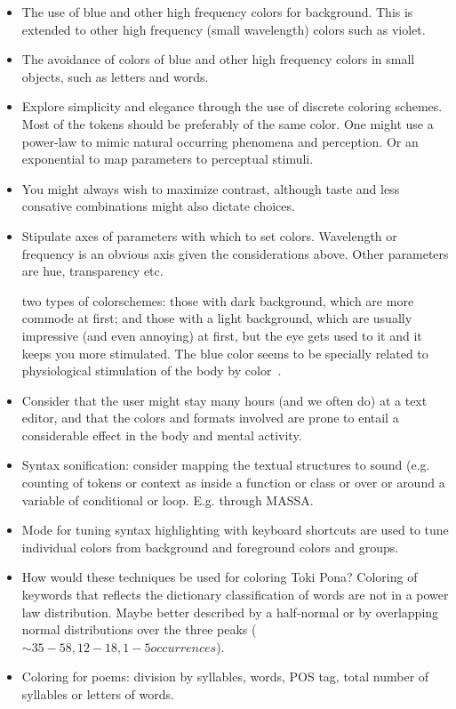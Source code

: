 \documentclass{article}
\begin{document}
\begin{itemize}
  \item The use of blue and other high frequency colors for
  background.
  This is extended to other high frequency (small wavelength)
  colors such as violet.
  \item The avoidance of colors of blue and other high frequency
  colors in small objects, such as letters and words.
  \item Explore simplicity and elegance through the use of discrete
  coloring schemes. Most of the tokens should be preferably of
  the same color.
  One might use a power-law to mimic natural occurring phenomena
  and perception. Or an exponential to map parameters to perceptual
  stimuli.
  \item You might always wish to maximize contrast,
  although taste and less consative combinations might
  also dictate choices.
  \item Stipulate axes of parameters with which to set colors.
  Wavelength or frequency is an obvious axis given the considerations
  above.
  Other parameters are hue, transparency etc.

  two types of colorschemes: those with dark background,
  which are more commode at first; and those with a light background,
  which are usually impressive (and even annoying) at first,
  but the eye gets used to it and it keeps you more stimulated.
  The blue color seems to be specially related to physiological
  stimulation of the body by color~\cite{blue,blue}.
  \item Consider that the user might stay many hours (and we often do)
  at a text editor, and that the colors and formats involved are
  prone to entail a considerable effect in the body and mental
  activity.
  \item Syntax sonification: consider mapping the textual structures
  to sound (e.g. counting of tokens or context as inside a function or
  class or over or around a variable of conditional or loop.
  E.g. through MASSA.
  \item Mode for tuning syntax highlighting with keyboard shortcuts
  are used to tune individual colors from background and foreground
  colors and groups.
  \item How would these techniques be used for coloring Toki Pona?
  Coloring of keywords that reflects the dictionary classification
  of words are not in a power law distribution.
  Maybe better described by a half-normal or by
  overlapping normal distributions over the three peaks ($\sim35-58,
  12-18, 1-5 occurrences$).
  \item Coloring for poems: division by syllables, words, POS tag,
    total number of syllables or letters of words.
\end{itemize}
\end{document}
